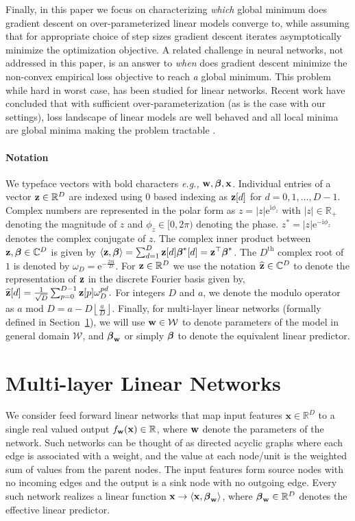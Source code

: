 \documentclass{article}
\renewcommand{\c}{\mathcal}
\newcommand{\bR}{\mathbb{R}}
\renewcommand{\hat}{\widehat}
\newcommand{\innerprod}[2]{\langle #1,#2 \rangle}
\newcommand{\Th}{\text{th}}
\newcommand{\eg}{\textit{e.g.,} }
\renewcommand{\u}[1][]{\ifthenelse{\equal{#1}{}}{\mathbf{w}}{\mathbf{w}^{(#1)}}}
\newcommand{\w}[1][]{\ifthenelse{\equal{#1}{}}{\boldsymbol{\beta}}{\boldsymbol{\beta}^{(#1)}}}
\newcommand{\z}[1][]{\ifthenelse{\equal{#1}{}}{\mathbf{z}}{\mathbf{z}^{(#1)}}}
\newcommand{\x}{\mathbf{x}}
\newcommand{\ci}{\mathbf{\mathrm{{i}}}}
\newcommand{\e}{\mathrm{e}}
\begin{document}
Finally, in this paper we focus on characterizing \textit{which} global minimum does gradient descent on over-parameterized linear models converge to, while assuming that for appropriate choice of step sizes gradient descent iterates asymptotically minimize the optimization objective.  A related challenge in neural networks,  not addressed in this paper, is an answer to \textit{when} does gradient descent minimize the non-convex empirical loss objective  to reach \textit{a} global minimum. This problem while hard in worst case, has been studied for linear networks. Recent work have concluded that with  sufficient over-parameterization (as is the case with our settings),  loss landscape of linear models are well behaved and all local minima are global minima making the problem tractable  \cite{burer2003nonlinear,journee2010low,kawaguchi2016deep,nguyen2017loss,lee2016gradient}.


\paragraph{Notation} 
We typeface vectors with bold characters \eg $\u,\w,\x$. Individual entries of a vector $\z\in\bR^D$ are indexed using  $0$ based indexing as $\z{[d]}$ for $d=0,1,\ldots,D-1$. 
Complex numbers are represented  in the polar form as $z=|z|\e^{\ci\phi_z}$ with $|z|\in\bR_+$ denoting the magnitude of $z$ and $\phi_z\in[0,2\pi)$ denoting the phase. $z^*=|z|\e^{-\ci\phi_z}$ denotes the complex conjugate of $z$. The complex inner product between $\z,\w\in\mathbb{C}^{D}$ is given by $\innerprod{\z}{\w}=\sum_{d=1}^D \z{[d]} \w^*{[d]}=\z^\top{\w^*}$. The $D^\Th$ complex root of $1$ is denoted by $\omega_D=\e^{-\frac{2\pi\ci}{D}}$. For  $\z\in\bR^D$ we use the notation $\hat{\z}\in\mathbb{C}^D$ to denote  the representation of $\z$ in the discrete Fourier basis given by, 
$\hat{\z}[d]=\frac{1}{\sqrt{D}}\sum_{p=0}^{D-1} \z{[p]}\omega^{pd}_D.$ For integers $D$ and $a$, we denote the modulo operator as $a\text{ mod }D=a-D\left\lfloor\frac{a}{D}\right\rfloor$. 
Finally, for multi-layer linear networks (formally defined in Section~\ref{sec:lnn}), we will use $\u\in\c{W}$ to denote parameters of the model in general domain $\c{W}$, and $\w_{\u}$ or simply $\w$ to denote the equivalent linear predictor.


\section{Multi-layer Linear  Networks}\label{sec:lnn}
We consider feed forward linear networks that map input features $\x\in\bR^D$ to a single real valued output $f_{\u}(\x)\in\bR$, where $\u$ denote the parameters of the network. Such networks can be thought of as  directed acyclic graphs where each edge is associated with a weight, and the value at each node/unit is the weighted sum of  values from the parent nodes. The input features form source nodes with no incoming edges and the output is a sink node with no outgoing edge. Every such network realizes a linear function $\x\to\innerprod{\x}{\w_{\u}}$, where $\w_{\u}\in\bR^D$ denotes the effective linear predictor. %
\end{document}
